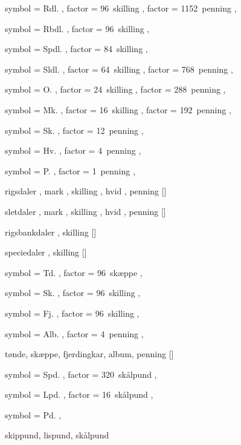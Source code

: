 
 {
	symbol = { Rdl. } ,
	factor = { 96~skilling } ,
	factor = { 1152~penning } ,
}

 {
	symbol = { Rbdl. } ,
	factor = { 96~skilling } ,
}

 {
	symbol = { Spdl. } ,
	factor = { 84~skilling } ,
}

 {
	symbol = { Sldl. } ,
	factor = { 64~skilling } ,
	factor = { 768~penning } ,
}

 {
	symbol = { O. } ,
	factor = { 24~skilling } ,
	factor = { 288~penning } ,
}

 {
	symbol = { Mk. } ,
	factor = { 16~skilling } ,
	factor = { 192~penning } ,
}

 {
	symbol = { Sk. } ,
	factor = { 12~penning } ,
}

 {
	symbol = { Hv. } ,
	factor = { 4~penning } ,
}

 {
	symbol = { P. } ,
	factor = { 1~penning } ,
}

 {
	rigsdaler ,
	mark ,
	skilling ,
	hvid ,
	penning
}[\rdl]

 {
	sletdaler ,
	mark ,
	skilling ,
	hvid ,
	penning
}[\sldl]

 {
	rigsbankdaler ,
	skilling
}[\rbdl]

 {
	speciedaler ,
	skilling
}[\spdl]


 {
	symbol = { Td. } ,
	factor = { 96~skæppe } ,
}

 {
	symbol = { Sk. } ,
	factor = { 96~skilling } ,
}

 {
	symbol = { Fj. } ,
	factor = { 96~skilling } ,
}

 {
	symbol = { Alb. } ,
	factor = { 4~penning } ,
}

 {
	tønde,
	skæppe,
	fjerdingkar,
	album,
	penning
}[\hartkorn]


 {
	symbol = { Spd. } ,
	factor = { 320~skålpund } ,
}

 {
	symbol = { Lpd. } ,
	factor = { 16~skålpund } ,
}

 {
	symbol = { Pd. } ,
}

 {
	skippund,
	lispund,
	skålpund
}
